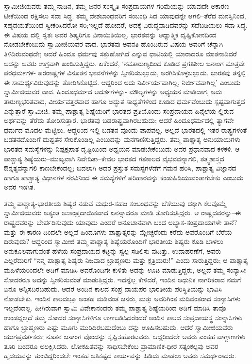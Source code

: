 ಸ್ವಾಮೀಜಿಯವರು ತಮ್ಮ ನಾಡಿನ, ತಮ್ಮ ಜನರ ಸಂಸ್ಕೃತಿ-ಸಂಪ್ರದಾಯಗಳ ಗರಿಮೆಯನ್ನು ಯಾವುದೇ ಅಕಾರಣ ಟೀಕೆಯಿಂದ ರಕ್ಷಿಸಲು ಸದಾ ಸಿದ್ಧ. ತಮ್ಮ ದೇಶಬಾಂಧವರಿಗೆ ಸಂಬಂಧಿ ಸಿದ ಯಾವುದನ್ನೇ ಆಗಲಿ–ತೆರೆದ ಮನಸ್ಸಿನಿಂದ, ಸಹೃದಯತೆಯಿಂದ ಸ್ವೀಕರಿಸಿದರೋ ಸರಿ;ಇಲ್ಲದೆ ಹೋದರೆ, ಅದಕ್ಕೆ ವಿರುದ್ಧವಾಡಿದವರನ್ನು ಸದೆಬಡಿಯಲು ಸದಾ ಸಿದ್ಧ. ಈ ವಿಷಯ ದಲ್ಲಿ ಸ್ವತಃ ಅವರ ಶಿಷ್ಯರಿಗೂ ವಿನಾಯಿತಿಯಿಲ್ಲ. ಭಾರತವನ್ನು ಆಧ್ಯಾತ್ಮಿಕ ದೃಷ್ಟಿಕೋನದಿಂದ ನೋಡಬೇಕೆಂಬುದು ಸ್ವಾಮೀಜಿಯವರ ವಾದ. ಭಾರತವು ಅವನತಿ ಹೊಂದಿರುವ ವಿಷಯ ಅವರಿಗೆ ಚೆನ್ನಾಗಿ ತಿಳಿದಿರುವಂಥದೇ; ಆದರೆ ಹಿಂದೂ ಧರ್ಮವು ಸತ್ತುಹೋಗಿದೆ ಎನ್ನುವ ಧಾಟಿಯಲ್ಲಿ ಯಾರಾದರೂ ಮಾತನಾಡಿದರೆ ಅದನ್ನು ಅವರು ಉಗ್ರವಾಗಿ ಖಂಡಿಸುತ್ತಿದ್ದರು. ಏಕೆಂದರೆ, ‘ನವತಾರುಣ್ಯದಿಂದ ಕೂಡಿದ ಪ್ರಗತಿಶೀಲ ಜನಾಂಗ ಮಾತ್ರವೇ ಪರಧರ್ಮಗಳ- ಪರರಾಷ್ಟ್ರಗಳ ವಿನೂತನ ಭಾವನೆಗಳನ್ನು ಸ್ವೀಕರಿಸಬಲ್ಲುದು, ಅರಗಿಸಿಕೊಳ್ಳಬಲ್ಲುದು. ಭಾರತವು ತನ್ನಲ್ಲಿ ಈ ಸಾಮರ್ಥ್ಯವಿರುವುದನ್ನು ತೋರಿಸಿಕೊಟ್ಟಿದೆ. ಆದ್ದರಿಂದ ಅದು ನಿರ್ವೀರ್ಯವಾಗಿಲ್ಲ, ನಿರ್ಜೀವವಾಗಿಲ್ಲ’ ಎಂಬುದು ಸ್ವಾಮೀಜಿಯವರ ವಾದ. ಹಿಂದೂಧರ್ಮದ ಆದರ್ಶಗಳನ್ನು- ಮೌಲ್ಯಗಳನ್ನು ಅಧ್ಯಯನ ಮಾಡಿದಾಗ, ಅದು ತಾರುಣ್ಯಭರಿತವಾದ, ವೀರ್ಯವತ್ತರವಾದ ಹಾಗೂ ಅದ್ಭುತ ಸಾಧ್ಯತೆಗಳಿಂದ ಕೂಡಿದ ಧರ್ಮವೆಂಬುದು ಸ್ಪಷ್ಟವಾಗುತ್ತದೆ ಎನ್ನುತ್ತಾರೆ ಸ್ವಾಮೀಜಿ. ತಮ್ಮ ಪಾಶ್ಚಾತ್ಯ ಶಿಷ್ಯೆಯರಿಗೆ ಭಾರತದ ಪ್ರತಿಯೊಂದು ಸಂಪ್ರದಾಯದ ಹಿನ್ನೆಲೆಯ ಲ್ಲಿರುವ ಅರ್ಥವನ್ನು ತೆರೆದು ತೋರಿಸುತ್ತಾರೆ. ಭಾರತವು ಬಡರಾಷ್ಟ್ರವಾಗಿರಬಹುದು; ಆದರೆ ಹಿಂದೂಧರ್ಮದಲ್ಲಿ ತ್ಯಾಗವೇ ಧರ್ಮದ ಮೊದಲ ಮೆಟ್ಟಿಲು. ಆದ್ದರಿಂದ ಇಲ್ಲಿ ಬಡತನ ವೊಂದು ಪಾಪವಲ್ಲ. ಅಲ್ಲದೆ ಭಾರತದಲ್ಲಿ ಇತರ ರಾಷ್ಟ್ರಗಳಂತೆ ಬಡತನದೊಂದಿಗೆ ದುಷ್ಟತನ ಸೇರಿಕೊಂಡಿಲ್ಲ ಎಂಬುದನ್ನು ಮನಗಾಣಿಸುತ್ತಿದ್ದರು. ತಮ್ಮ ಪಾಶ್ಚಾತ್ಯ ಅನುಯಾಯಿಗಳು ಭಾರತದ ಸಮಸ್ಯೆಗಳನ್ನು ನಿಷ್ಪಕ್ಷಪಾತ ದೃಷ್ಟಿಯಿಂದ ಅಧ್ಯಯನ ಮಾಡಬೇಕೆಂಬುದು ಅವರ ಪ್ರಧಾನವಾದ ಕಳಕಳಿ. ಆ ಪಾಶ್ಚಾತ್ಯ ಶಿಷ್ಯೆಯರು–ಮುಖ್ಯವಾಗಿ ನಿವೇದಿತಾ–ಕೇವಲ ಭಾರತದ ಗತಕಾಲದ ವೈಭವವನ್ನಾಗಲಿ, ತತ್ತ್ವಶಾಸ್ತ್ರದ ಔನ್ನತ್ಯವನ್ನಾಗಲಿ ಕಾಣಬೇಕೆಂದಲ್ಲ; ಬದಲಾಗಿ ಅದರ ಪ್ರಸ್ತುತ ಸಮಸ್ಯೆಗಳೆಡೆಗೆ ಗಮನ ಹರಿಸಿ, ಪಾಶ್ಚಾತ್ಯ ವಿಜ್ಞಾನದ ಹಾಗೂ ಪಾಶ್ಚಾತ್ಯ ವಿಧಾನಗಳ ನೆರವಿನಿಂದ ಈ ಸಮಸ್ಯೆಗಳಿಗೆ ಪರಿಹಾರವನ್ನು ಕಂಡುಹಿಡಿಯುವಂತಾಗಬೇಕು ಎಂಬುದು ಅವರ ಇಂಗಿತ.

ತಮ್ಮ ಪಾಶ್ಚಾತ್ಯ-ಭಾರತೀಯ ಶಿಷ್ಯರ ನಡುವೆ ಮಧುರ-ಸಹಜ ಸಂಬಂಧವನ್ನು ಬೆಸೆಯುವು ದಕ್ಕಾಗಿ ಕೆಲವೊಮ್ಮೆ ಸ್ವಾಮೀಜಿಯವರು ಅತ್ಯಂತ ಅಸಾಂಪ್ರದಾಯಿಕವಾದ ಏನನ್ನಾದರೂ ಮಾಡಿ ತೋರಿಸುತ್ತಿದ್ದರು. ಆ ರಾಷ್ಟ್ರದವರನ್ನು–ಈ ರಾಷ್ಟ್ರದವರನ್ನು ಬೇರ್ಪಡಿಸುವುದು ಯಾವುದು ಎಂದರೆ ಅನೂಚಾನವಾಗಿ ಬಂದ ಅಭ್ಯಾಸ-ಸಂಪ್ರದಾಯಗಳೇ ತಾನೆ? ಮತ್ತು ಈ ಕಾರಣ ದಿಂದಲೇ ಅಲ್ಲವೆ ಹಿಂದೂಗಳು ಪಾಶ್ಚಾತ್ಯರನ್ನು ಮ್ಲೇಚ್ಛರೆಂದು ಕರೆದು ಅವರೊಂದಿಗೆ ಬೆರೆಯ ದಿರುವುದು? ಆದ್ದರಿಂದ ಸ್ವಾಮೀಜಿ ತಮ್ಮ ಪಾಶ್ಚಾತ್ಯ ಶಿಷ್ಯೆಯರೊಂದಿಗೆ ಭಾರತೀಯ ಶಿಷ್ಯರು ಕೂಡಿ ಬಾಳಲು ಅನುಕೂಲವಾಗುವಂತೆ ಹಳೆಯ ಸಂಪ್ರದಾಯದ ಕಟ್ಟನ್ನು ಸ್ವಲ್ಪ ಸಡಿಲಿಸು ವುದಿತ್ತು. ಉದಾಹರಣೆಗೆ, ಅವರು ಎಲ್ಲರೆದುರಿಗೆ “ನನ್ನ ಪಾಶ್ಚಾತ್ಯ ಶಿಷ್ಯರು ನಿಜವಾದ ಬ್ರಾಹ್ಮಣರು ಮತ್ತು ಕ್ಷತ್ರಿಯರು!” ಎಂದು ಸಾರುತ್ತಿದ್ದರು; ಆ ಪಾಶ್ಚಾತ್ಯ ಮಹಿಳೆಯರಿಂದಲೇ ಅಡಿಗೆ ಮಾಡಿಸಿ ಅವರೊಂದಿಗೇ ಕುಳಿತು ಅದನ್ನು ಊಟ ಮಾಡುತ್ತಿದ್ದರು, ಅಲ್ಲದೆ ತಮ್ಮ ಸಂನ್ಯಾಸೀ ಸೋದರರೂ ಅದನ್ನು ಸ್ವೀಕರಿಸುವಂತೆ ಮಾಡುತ್ತಿದ್ದರು. ಇದನ್ನೆಲ್ಲ ಕೇಳಿದರೆ, ಇಂದಿನ ಆಧುನಿಕ ನಾಗರಿಕರಾದ ನಮಗೆ ಏನೂ ಅನ್ನಿಸದಿರಬಹುದು. ಆದರೆ ಅಂದಿನ ಕಾಲದ ಸಂಪ್ರ ದಾಯಪರ ಭಾರತೀಯ ಪರಿಸ್ಥಿತಿಯನ್ನು ಭಾವಿಸಿ ನೋಡಬೇಕು. ಇಂದಿನ ಕಾಲದಲ್ಲೂ ಅಂತಹ ಮಡಿವಂತ ಜನರು, ಮತ್ತು ಅವರಿಗಿಂತ ಮಡಿವಂತರಾದ ಸಂನ್ಯಾಸಿಗಳು ಇಲ್ಲವೆಂದಲ್ಲ. ಹೀಗಿರುವಾಗ ಸ್ವಾಮಿ ವಿವೇಕಾನಂದರು ತಮ್ಮ ಪಾಶ್ಚಾತ್ಯ ಶಿಷ್ಯೆಯರಿಂದ ಅಡಿಗೆ ಮಾಡಿಸಿ ತಾವೂ ಉಂಡದ್ದಲ್ಲದೆ ತಮ್ಮ ಸೋದರ ಸಂನ್ಯಾಸಿಗಳಿಗೂ ಉಣಬಡಿಸಿದರೆಂದರೆ ಅಂದಿನ ಕಾಲದ ಸಂಪ್ರದಾಯಸ್ಥ ಸಂನ್ಯಾಸಿಗಳು ಹಾಗೂ ಬ್ರಾಹ್ಮಣರು ಎಷ್ಟು ಮೂಗು ಮುರಿದಿರಬಹುದೆಂಬು ದನ್ನು ಊಹಿಸಬಹುದು. ಆದರೆ ಸ್ವಾಮೀಜಿಯವರು ಯುಗಪ್ರವರ್ತಕರು; ನೂತನ ಜನಾಂಗ ವೊಂದನ್ನು ಸೃಷ್ಟಿಸಹೊರಟವರು. ಆದ್ದರಿಂದಲೇ ಅವರು ಎಂತಹ ವಾಗ್ಬಾಣಗಳು ತೂರಿ ಬಂದರೂ ಅಲಕ್ಷಿಸಿದರು. ಲೋಕಹಿತವನ್ನು ಸಾಧಿಸಬೇಕೆಂಬ ಪ್ರಾಮಾಣಿಕ-ಧೀರ ಸತ್ಸಂಕಲ್ಪವು ಅವರ ಹೃದಯವನ್ನು ತುಂಬಿದ್ದರಿಂದಲೇ ಇಂತಹ ಅತಿಕಷ್ಟದ ಕಾರ್ಯವನ್ನು ಹಿಡಿದು ಮಾಡಲು ಅವರು ಸಮರ್ಥರಾದರು.

